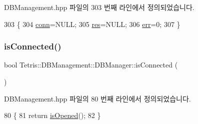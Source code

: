 D\+B\+Management.\+hpp 파일의 303 번째 라인에서 정의되었습니다.


\begin{DoxyCode}
303                           \{
304                 \hyperlink{class_tetris_1_1_d_b_management_1_1_d_b_manager_acc2c19420c2b1b1b2c1e724b3a8ec4b7}{conn}=NULL;
305                 \hyperlink{class_tetris_1_1_d_b_management_1_1_d_b_manager_af161e9c2d2f9dea602bea867542deedb}{res}=NULL;
306                 \hyperlink{class_tetris_1_1_d_b_management_1_1_d_b_manager_a9ea8d963f1a9b8117fa5e92b54eda114}{err}=0;
307             \}
\end{DoxyCode}
\mbox{\label{class_tetris_1_1_d_b_management_1_1_d_b_manager_a62043d50855f42b69b057527b14dec0f}} 
\subsubsection{\texorpdfstring{is\+Connected()}{isConnected()}}
{\footnotesize\ttfamily bool Tetris\+::\+D\+B\+Management\+::\+D\+B\+Manager\+::is\+Connected (\begin{DoxyParamCaption}{ }\end{DoxyParamCaption})\hspace{0.3cm}{\ttfamily [inline]}}



D\+B\+Management.\+hpp 파일의 80 번째 라인에서 정의되었습니다.


\begin{DoxyCode}
80                               \{
81                 \textcolor{keywordflow}{return} \hyperlink{class_tetris_1_1_d_b_management_1_1_d_b_manager_a16460066d64c9183a63194177bb0458e}{isOpened}();
82             \}
\end{DoxyCode}
\mbox{\label{class_tetris_1_1_d_b_management_1_1_d_b_manager_aa80722572c33389c1c73f88de9f199b6}} 
